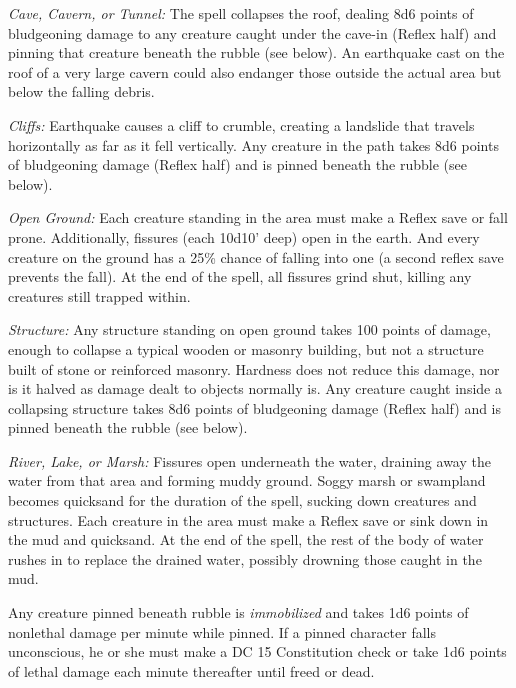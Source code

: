\begin{list}{}{\leftmargin=1em}
\item \emph{Cave, Cavern, or Tunnel:}
The spell collapses the roof, dealing 8d6 points of bludgeoning damage to any creature caught under the cave-in (Reflex half) and pinning that creature beneath the rubble (see below).
An earthquake cast on the roof of a very large cavern could also endanger those outside the actual area but below the falling debris.

\item \emph{Cliffs:}
Earthquake causes a cliff to crumble, creating a landslide that travels horizontally as far as it fell vertically. 
Any creature in the path takes 8d6 points of bludgeoning damage (Reflex half) and is pinned beneath the rubble (see below).

\item \emph{Open Ground:}
Each creature standing in the area must make a Reflex save or fall prone. 
Additionally, fissures (each 10d10' deep) open in the earth. And every creature on the ground has a 25\% chance of falling into one (a second reflex save prevents the fall). 
At the end of the spell, all fissures grind shut, killing any creatures still trapped within.

\item \emph{Structure:}
Any structure standing on open ground takes 100 points of damage, enough to collapse a typical wooden or masonry building, but not a structure built of stone or reinforced masonry. 
Hardness does not reduce this damage, nor is it halved as damage dealt to objects normally is. 
Any creature caught inside a collapsing structure takes 8d6 points of bludgeoning damage (Reflex half) and is pinned beneath the rubble (see below).

\item \emph{River, Lake, or Marsh:}
Fissures open underneath the water, draining away the water from that area and forming muddy ground. 
Soggy marsh or swampland becomes quicksand for the duration of the spell, sucking down creatures and structures. 
Each creature in the area must make a Reflex save or sink down in the mud and quicksand. 
At the end of the spell, the rest of the body of water rushes in to replace the drained water, possibly drowning those caught in the mud.
\end{list}
Any creature pinned beneath rubble is \emph{immobilized} and takes 1d6 points of nonlethal damage per minute while pinned. 
If a pinned character falls unconscious, he or she must make a DC 15 Constitution check or take 1d6 points of lethal damage each minute thereafter until freed or dead.

